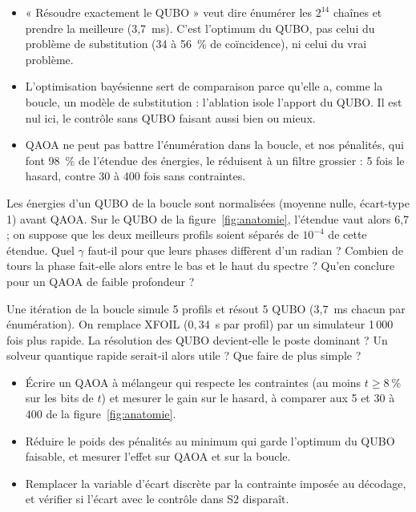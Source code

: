 \begin{resultat}
\begin{itemize}
\item « Résoudre exactement le QUBO » veut dire énumérer les $2^{14}$ chaînes et prendre la meilleure (3,7~ms). C'est l'optimum du QUBO, pas celui du problème de substitution (34 à 56~\% de coïncidence), ni celui du vrai problème.
\item L'optimisation bayésienne sert de comparaison parce qu'elle a, comme la boucle, un modèle de substitution : l'ablation isole l'apport du QUBO. Il est nul ici, le contrôle sans QUBO faisant aussi bien ou mieux.
\item QAOA ne peut pas battre l'énumération dans la boucle, et nos pénalités, qui font 98~\% de l'étendue des énergies, le réduisent à un filtre grossier : 5 fois le hasard, contre 30 à 400 fois sans contraintes.
\end{itemize}
\end{resultat}

\exercices
\begin{exercice}\label{ex:gamma-ecart}
Les énergies d'un QUBO de la boucle sont normalisées (moyenne nulle, écart-type 1) avant QAOA. Sur le QUBO de la figure~\ref{fig:anatomie}, l'étendue vaut alors 6,7 ; on suppose que les deux meilleurs profils soient séparés de $10^{-4}$ de cette étendue. Quel $\gamma$ faut-il pour que leurs phases diffèrent d'un radian ? Combien de tours la phase fait-elle alors entre le bas et le haut du spectre ? Qu'en conclure pour un QAOA de faible profondeur ?
\end{exercice}
\begin{exercice}\label{ex:amdahl}
Une itération de la boucle simule 5 profils et résout 5 QUBO (3,7~ms chacun par énumération). On remplace XFOIL ($0{,}34$~s par profil) par un simulateur 1\,000 fois plus rapide. La résolution des QUBO devient-elle le poste dominant ? Un solveur quantique rapide serait-il alors utile ? Que faire de plus simple ?
\end{exercice}

\begin{pistes}
\begin{itemize}
\item Écrire un QAOA à mélangeur qui respecte les contraintes (au moins $t\ge8~\%$ sur les bits de $t$) et mesurer le gain sur le hasard, à comparer aux 5 et 30 à 400 de la figure~\ref{fig:anatomie}.
\item Réduire le poids des pénalités au minimum qui garde l'optimum du QUBO faisable, et mesurer l'effet sur QAOA et sur la boucle.
\item Remplacer la variable d'écart discrète par la contrainte imposée au décodage, et vérifier si l'écart avec le contrôle dans S2 disparaît.
\end{itemize}
\end{pistes}
